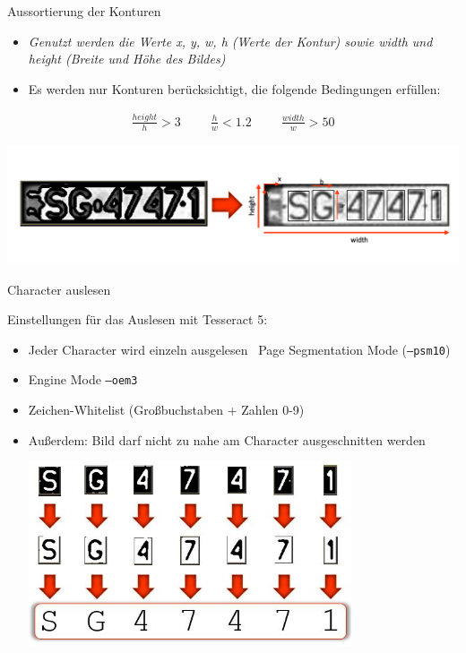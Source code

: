 \begin{frame}{Aussortierung der Konturen}
\begin{itemize}
\item {\textit{\scriptsize Genutzt werden die Werte x, y, w, h (Werte der Kontur) sowie width und height (Breite und Höhe des Bildes)}}
\item {\scriptsize Es werden nur Konturen berücksichtigt, die folgende Bedingungen erf\"ullen:}
\end{itemize}
\begin{align*}
    \frac{height}{h} > 3
    \hspace{1cm}
    \frac{h}{w} < 1.2
    \hspace{1cm}
    \frac{width}{w} > 50
\end{align*}
    \begin{center}
        \includegraphics[width=\textwidth]{img/contours}
    \end{center}
\end{frame}

\begin{frame}{Character auslesen}

{\footnotesize Einstellungen für das Auslesen mit Tesseract 5:}
\begin{itemize}
\item {\scriptsize Jeder Character wird einzeln ausgelesen \rightarrow  \, Page Segmentation Mode (\texttt{--psm10})}
\item {\scriptsize Engine Mode \texttt{--oem3}}
\item {\scriptsize Zeichen-Whitelist (Großbuchstaben + Zahlen 0-9)}
\item {\scriptsize Außerdem: Bild darf nicht zu nahe am Character ausgeschnitten werden}

\begin{center}
    \includegraphics[width=0.75\textwidth]{img/char_preprocessing.jpg}
\end{center}

\end{itemize}
\end{frame}


